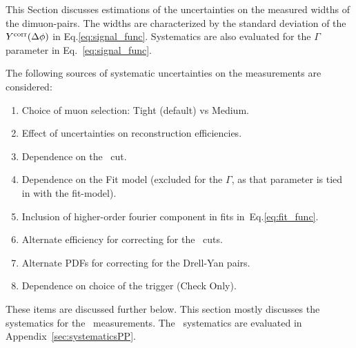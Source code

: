 This Section discusses estimations of the uncertainties on the
  measured widths \iftoggle{IncludeYields}{and Yields}{} of the dimuon-pairs.
The widths are characterized by the standard deviation of the $
  Y^{\mathrm{corr}} (\mbox{$\Delta\phi$})$ in Eq.\eqref{eq:signal_func}.
Systematics are also evaluated for the $\Gamma$ parameter
  in Eq.~\eqref{eq:signal_func}.


The following sources of systematic uncertainties on the measurements 
  are considered:
\begin{enumerate}
\iftoggle{IncludeYields}
{
  \item Luminosity and \TAA\ uncertainties
}{}
\item Choice of muon selection: Tight (default) vs Medium.
\item Effect of uncertainties on reconstruction efficiencies.
\item Dependence on the \Deta\ cut.
\item Dependence on the Fit model (excluded for the $\Gamma$, as that parameter is tied in with the fit-model).
\item Inclusion of higher-order fourier component in fits in~Eq.\eqref{eq:fit_func}.
\item Alternate efficiency for correcting for the \Mmumu\ cuts.
\item Alternate PDFs for correcting for the Drell-Yan pairs.
\item Dependence on choice of the trigger (Check Only).
\end{enumerate}
These items are discussed further below. 
This section mostly discusses the systematics for the \PbPb\ measurements.
The \pp\ systematics are evaluated in Appendix~\ref{sec:systematicsPP}.





\iftoggle{IncludeYields}
{
  \subsection{Luminosity and \TAA\ uncertainties\label{sec:systematics_lumi}}
  The luminosity used in this analysis as an uncertainty of $\pm1.5\%$ for the \PbPb\
    data and 1.6\% for the \pp\ data.
  While the measured yields are not directly affected by the luminosity,
    they are reported as yields corresponding to a luminosity of 1.93~\inb.
  For the \TAA\ scaled per-event yields Eq.~\eqref{eq:TaaYield},
    the $N_{\mathrm{events}}^{\mathrm{PbPb}}$ are obtained
    using the luminosity, so luminosity uncertainties
    are directly relevant.
  This uncertainty is directly propagated as an overall uncertainty 
    on the Yields and \TAA\ scaled per-event yields (or cross-section for \pp).
  Similarly the \TAA\ uncertainties (listed in Table~\ref{tbl:TAA})
    are propagated to the \TAA\ scaled per-event yields.
  These uncertainties do not affect the widths parameters of the fits.
}{}





